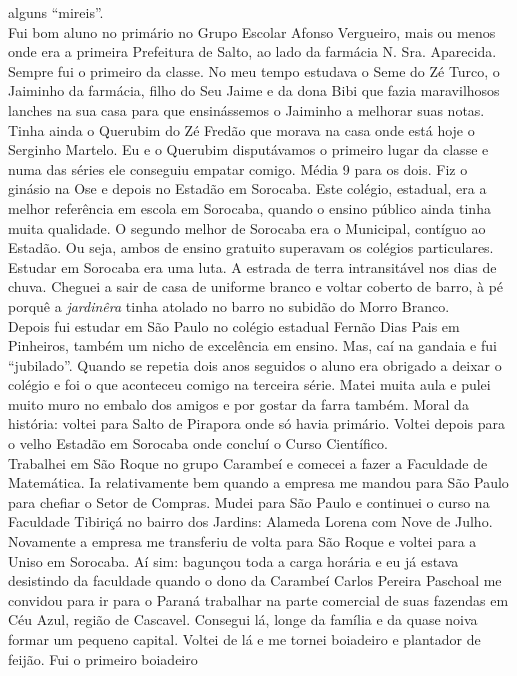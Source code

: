 \documentclass[12pt,brazil,]{book}
\begin{document}
alguns ``mireis''.\\
Fui bom aluno no primário no Grupo Escolar Afonso Vergueiro, mais ou
menos onde era a primeira Prefeitura de Salto, ao lado da farmácia N.
Sra. Aparecida. Sempre fui o primeiro da classe. No meu tempo estudava o
Seme do Zé Turco, o Jaiminho da farmácia, filho do Seu Jaime e da dona
Bibi que fazia maravilhosos lanches na sua casa para que ensinássemos o
Jaiminho a melhorar suas notas. Tinha ainda o Querubim do Zé Fredão que
morava na casa onde está hoje o Serginho Martelo. Eu e o Querubim
disputávamos o primeiro lugar da classe e numa das séries ele conseguiu
empatar comigo. Média 9 para os dois. Fiz o ginásio na Ose e depois no
Estadão em Sorocaba. Este colégio, estadual, era a melhor referência em
escola em Sorocaba, quando o ensino público ainda tinha muita qualidade.
O segundo melhor de Sorocaba era o Municipal, contíguo ao Estadão. Ou
seja, ambos de ensino gratuito superavam os colégios particulares.
Estudar em Sorocaba era uma luta. A estrada de terra intransitável nos
dias de chuva. Cheguei a sair de casa de uniforme branco e voltar
coberto de barro, à pé porquê a \emph{jardinêra} tinha atolado no barro
no subidão do Morro Branco.\\
Depois fui estudar em São Paulo no colégio estadual Fernão Dias Pais em
Pinheiros, também um nicho de excelência em ensino. Mas, caí na gandaia
e fui ``jubilado''. Quando se repetia dois anos seguidos o aluno era
obrigado a deixar o colégio e foi o que aconteceu comigo na terceira
série. Matei muita aula e pulei muito muro no embalo dos amigos e por
gostar da farra também. Moral da história: voltei para Salto de Pirapora
onde só havia primário. Voltei depois para o velho Estadão em Sorocaba
onde concluí o Curso Científico.\\
Trabalhei em São Roque no grupo Carambeí e comecei a fazer a Faculdade
de Matemática. Ia relativamente bem quando a empresa me mandou para São
Paulo para chefiar o Setor de Compras. Mudei para São Paulo e continuei
o curso na Faculdade Tibiriçá no bairro dos Jardins: Alameda Lorena com
Nove de Julho.\\
Novamente a empresa me transferiu de volta para São Roque e voltei para
a Uniso em Sorocaba. Aí sim: bagunçou toda a carga horária e eu já
estava desistindo da faculdade quando o dono da Carambeí Carlos Pereira
Paschoal me convidou para ir para o Paraná trabalhar na parte comercial
de suas fazendas em Céu Azul, região de Cascavel. Consegui lá, longe da
família e da quase noiva formar um pequeno capital. Voltei de lá e me
tornei boiadeiro e plantador de feijão. Fui o primeiro boiadeiro
\end{document}
